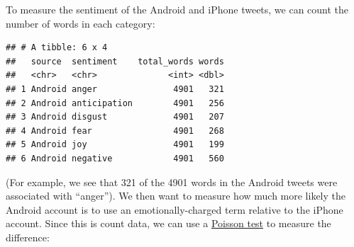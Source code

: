 \documentclass[
]{article}
\newenvironment{Shaded}{\begin{snugshade}}{\end{snugshade}}
\newcommand{\DataTypeTok}[1]{\textcolor[rgb]{0.13,0.29,0.53}{#1}}
\newcommand{\DecValTok}[1]{\textcolor[rgb]{0.00,0.00,0.81}{#1}}
\newcommand{\KeywordTok}[1]{\textcolor[rgb]{0.13,0.29,0.53}{\textbf{#1}}}
\newcommand{\NormalTok}[1]{#1}
\newcommand{\OperatorTok}[1]{\textcolor[rgb]{0.81,0.36,0.00}{\textbf{#1}}}
\newcommand{\StringTok}[1]{\textcolor[rgb]{0.31,0.60,0.02}{#1}}
\begin{document}
To measure the sentiment of the Android and iPhone tweets, we can count
the number of words in each category:

\begin{Shaded}
\end{Shaded}

\begin{verbatim}
## # A tibble: 6 x 4
##   source  sentiment    total_words words
##   <chr>   <chr>              <int> <dbl>
## 1 Android anger               4901   321
## 2 Android anticipation        4901   256
## 3 Android disgust             4901   207
## 4 Android fear                4901   268
## 5 Android joy                 4901   199
## 6 Android negative            4901   560
\end{verbatim}

(For example, we see that 321 of the 4901 words in the Android tweets
were associated with ``anger''). We then want to measure how much more
likely the Android account is to use an emotionally-charged term
relative to the iPhone account. Since this is count data, we can use a
\href{https://stat.ethz.ch/R-manual/R-devel/library/stats/html/poisson.test.html}{Poisson
test} to measure the difference:
\end{document}
